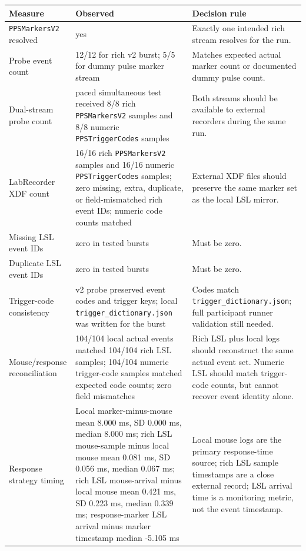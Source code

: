 \documentclass[11pt]{article}
\begin{document}
\begin{longtable}{|p{}|p{}|p{}|}
\hline
\textbf{Measure} & \textbf{Observed} & \textbf{Decision rule} \\
\hline
\texttt{PPSMarkersV2} resolved & yes & Exactly one intended rich stream
resolves for the run. \\
\hline
Probe event count & 12/12 for rich v2 burst; 5/5 for dummy pulse marker stream
& Matches expected actual marker count or documented dummy pulse count. \\
\hline
Dual-stream probe count & paced simultaneous test received 8/8 rich
\texttt{PPSMarkersV2} samples and 8/8 numeric \texttt{PPSTriggerCodes} samples
& Both streams should be available to external recorders during the same run. \\
\hline
LabRecorder XDF count & 16/16 rich \texttt{PPSMarkersV2} samples and 16/16
numeric \texttt{PPSTriggerCodes} samples; zero missing, extra, duplicate, or
field-mismatched rich event IDs; numeric code counts matched & External XDF
files should preserve the same marker set as the local LSL mirror. \\
\hline
Missing LSL event IDs & zero in tested bursts & Must be zero. \\
\hline
Duplicate LSL event IDs & zero in tested bursts & Must be zero. \\
\hline
Trigger-code consistency & v2 probe preserved event codes and trigger keys;
local \texttt{trigger\_dictionary.json} was written for the burst & Codes match
\texttt{trigger\_dictionary.json}; full participant runner validation still
needed. \\
\hline
Mouse/response reconciliation & 104/104 local actual events matched 104/104
rich LSL samples; 104/104 numeric trigger-code samples matched expected code
counts; zero field mismatches & Rich LSL plus local logs should reconstruct the
same actual event set. Numeric LSL should match trigger-code counts, but cannot
recover event identity alone. \\
\hline
Response strategy timing & Local marker-minus-mouse mean 8.000 ms, SD 0.000
ms, median 8.000 ms; rich LSL mouse-sample minus local mouse mean 0.081 ms, SD
0.056 ms, median 0.067 ms; rich LSL mouse-arrival minus local mouse mean 0.421
ms, SD 0.223 ms, median 0.339 ms; response-marker LSL arrival minus marker
timestamp median -5.105 ms & Local mouse logs are the primary response-time
source; rich LSL sample timestamps are a close external record; LSL arrival
time is a monitoring metric, not the event timestamp. \\

\end{longtable}
\end{document}
